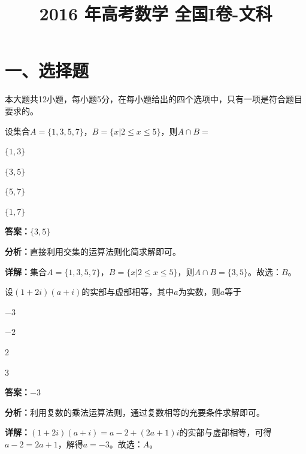﻿\title{2016 年高考数学 全国I卷-文科}
\date{}
\maketitle

\section*{一、选择题}
本大题共12小题，每小题5分，在每小题给出的四个选项中，只有一项是符合题目要求的。

\begin{question}[points=5]
设集合$A=\{1,3,5,7\}$，$B=\{x|2\le x\le5\}$，则$A\cap B=$
\begin{choices}
  \item $\{1,3\}$
  \item $\{3,5\}$
  \item $\{5,7\}$
  \item $\{1,7\}$
\end{choices}
\begin{solution}
\textbf{答案：}$\{3,5\}$

\textbf{分析：}直接利用交集的运算法则化简求解即可。

\textbf{详解：}集合$A=\{1,3,5,7\}$，$B=\{x|2\le x\le5\}$，则$A\cap B=\{3,5\}$。故选：$B$。
\end{solution}
\end{question}

\begin{question}[points=5]
设$(1+2i)(a+i)$的实部与虚部相等，其中$a$为实数，则$a$等于
\begin{choices}
  \item $-3$
  \item $-2$
  \item $2$
  \item $3$
\end{choices}
\begin{solution}
\textbf{答案：}$-3$

\textbf{分析：}利用复数的乘法运算法则，通过复数相等的充要条件求解即可。

\textbf{详解：}$(1+2i)(a+i)=a-2+(2a+1)i$的实部与虚部相等，可得$a-2=2a+1$，解得$a=-3$。故选：$A$。
\end{solution}
\end{question}

